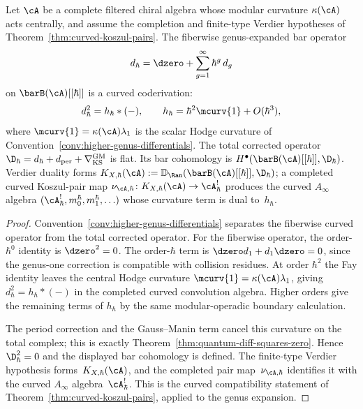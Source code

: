 \begin{theorem}
\label{thm:genus-deformation-exact}
Let $\cA$ be a complete filtered chiral algebra whose modular
curvature $\kappa(\cA)$ acts centrally, and assume the completion and
finite-type Verdier hypotheses of
Theorem~\ref{thm:curved-koszul-pairs}. The fiberwise
genus-expanded bar operator
\[
d_{\hbar} = \dzero + \sum_{g=1}^\infty \hbar^g\, d_g
\]
on $\barB(\cA)[[\hbar]]$ is a curved coderivation:
\[
d_\hbar^2 = h_\hbar\ast(-),\qquad
h_\hbar=\hbar^2\mcurv{1}+O(\hbar^3),
\]
where $\mcurv{1}=\kappa(\cA)\lambda_1$ is the scalar Hodge curvature
of Convention~\textup{\ref{conv:higher-genus-differentials}}.
The total corrected operator
$\D_\hbar=d_\hbar+d_{\mathrm{per}}+\nabla_{\mathrm{KS}}^{\mathrm{GM}}$
is flat. Its bar cohomology is
$H^\bullet(\barB(\cA)[[\hbar]],\D_\hbar)$.  Verdier duality forms
$K_{X,\hbar}(\cA):=\mathbb D_{\Ran}
(\barB(\cA)[[\hbar]],\D_\hbar)$; a completed curved Koszul-pair map
$\nu_{\cA,\hbar}\colon K_{X,\hbar}(\cA)\to\cA^!_\hbar$ produces the
curved $A_\infty$ algebra
$(\cA^!_\hbar,m_0^\hbar,m_1^\hbar,\ldots)$ whose curvature term is
dual to~$h_\hbar$.
\end{theorem}

\begin{proof}
Convention~\ref{conv:higher-genus-differentials} separates the
fiberwise curved operator from the total corrected operator. For the
fiberwise operator, the order-$\hbar^0$ identity is
$\dzero^2=0$. The order-$\hbar$ term is
$\dzero d_1+d_1\dzero=0$, since the genus-one correction is compatible
with collision residues. At order $\hbar^2$ the Fay identity leaves
the central Hodge curvature
$\mcurv{1}=\kappa(\cA)\lambda_1$, giving
$d_\hbar^2=h_\hbar\ast(-)$ in the completed curved convolution
algebra. Higher orders give the remaining terms of $h_\hbar$ by the
same modular-operadic boundary calculation.

The period correction and the Gauss--Manin term cancel this curvature
on the total complex; this is exactly
Theorem~\ref{thm:quantum-diff-squares-zero}. Hence
$\D_\hbar^2=0$ and the displayed bar cohomology is defined.  The
finite-type Verdier hypothesis forms~$K_{X,\hbar}(\cA)$, and the
completed pair map~$\nu_{\cA,\hbar}$ identifies it with the curved
$A_\infty$ algebra~$\cA^!_\hbar$. This is the curved
compatibility statement of
Theorem~\ref{thm:curved-koszul-pairs}, applied to the genus expansion.
\end{proof}

